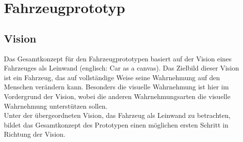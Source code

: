 \chapter{Fahrzeugprototyp}
\label{cha:Prototyp}
\section{Vision}
Das Gesamtkonzept für den Fahrzeugprototypen basiert auf der Vision eines \glqq Fahrzeuges als Leinwand\grqq{} (englisch: \glqq Car as a canvas\grqq{}). Das Zielbild dieser Vision ist ein Fahrzeug, das auf vollständige Weise seine Wahrnehmung auf den Menschen verändern kann. Besonders die visuelle Wahrnehmung ist hier im Vordergrund der Vision, wobei die anderen Wahrnehmungsarten die visuelle Wahrnehmung unterstützen sollen.\\
Unter der übergeordneten Vision, das Fahrzeug als Leinwand zu betrachten, bildet das Gesamtkonzept des Prototypen einen möglichen ersten Schritt in Richtung der Vision.
